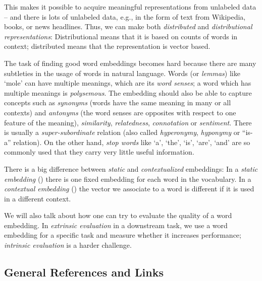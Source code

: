 \documentclass[11pt, a4paper]{amsart}
\begin{document}
This makes it possible to acquire meaningful representations from unlabeled data -- and there is lots of unlabeled data, e.g., in the form of text from Wikipedia, books, or news headlines.
Thus, we can make both \emph{distributed} and \emph{distributional representations}:
Distributional means that it is based on counts of words in context;
distributed means that the representation is vector based.

The task of finding good word embeddings becomes hard because there are many subtleties in the usage of words in natural language.
Words (or \emph{lemmas}) like `mole' can have multiple meanings, which are its \emph{word senses}; a word which has multiple meanings is \emph{polysemous}.
The embedding should also be able to capture concepts such as \emph{synonyms} (words have the same meaning in many or all contexts) and \emph{antonyms} (the word senses are opposites with respect to one feature of the meaning), \emph{similarity}, \emph{relatedness}, \emph{connotation} or \emph{sentiment}.
There is usually a \emph{super-subordinate} relation (also called \emph{hyperonymy}, \emph{hyponymy} or ``is-a'' relation).
On the other hand, \emph{stop words} like `a', `the', `is', `are', `and' are so commonly used that they carry very little useful information.

There is a big difference between \emph{static} and \emph{contextualized} embeddings:
In a \emph{static embedding} () there is one fixed embedding for each word in the vocabulary.
In a \emph{contextual embedding} () the vector we associate to a word is different if it is used in a different context.

We will also talk about how one can try to evaluate the quality of a word embedding.
In \emph{extrinsic evaluation} in a downstream task, we use a word embedding for a specific task and measure whether it increases performance; \emph{intrinsic evaluation} is a harder challenge.

\subsection{General References and Links}
\label{sec:general_references}
\end{document}
